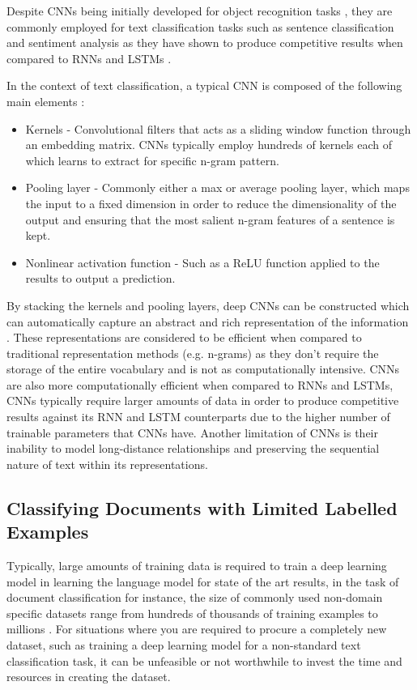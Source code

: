 \documentclass[a4paper,twoside,phd]{BYUPhys}
\begin{document}
Despite CNNs being initially developed for object recognition tasks \cite{LeCun1999}, they are commonly employed for text classification tasks such as sentence classification and sentiment analysis as they have shown to produce competitive results when compared to RNNs and LSTMs \cite{Collobert2011} \cite{Kim} \cite{Nogueira}. \newline

In the context of text classification, a typical CNN is composed of the following main elements \cite{Young}:

\begin{itemize}
	\item Kernels - Convolutional filters that acts as a sliding window function through an embedding matrix. CNNs typically employ hundreds of kernels each of which learns to extract for specific n-gram pattern.
	\item Pooling layer - Commonly either a max or average pooling layer, which maps the input to a fixed dimension in order to reduce the dimensionality of the output and ensuring that the most salient n-gram features of a sentence is kept.
	\item Nonlinear activation function - Such as a ReLU function applied to the results to output a prediction.
\end{itemize}

By stacking the kernels and pooling layers, deep CNNs can be constructed which can automatically capture an abstract and rich representation of the information \cite{Young}. These representations are considered to be efficient when compared to traditional representation methods (e.g. n-grams) as they don't require the storage of the entire vocabulary and is not as computationally intensive. CNNs are also more computationally efficient when compared to RNNs and LSTMs, CNNs typically require larger amounts of data in order to produce competitive results against its RNN and LSTM counterparts due to the higher number of trainable parameters that CNNs have. Another limitation of CNNs is their inability to model long-distance relationships and preserving the sequential nature of text within its representations.

\subsection{Classifying Documents with Limited Labelled Examples}
\label{sec:TransferLearning}
Typically, large amounts of training data is required to train a deep learning model in learning the language model for state of the art results, in the task of document classification for instance, the size of commonly used non-domain specific datasets range from hundreds of thousands of training examples to millions \cite{Conneau2017} \cite{Zhang}. For situations where you are required to procure a completely new dataset, such as training a deep learning model for a non-standard text classification task, it can be unfeasible  or not worthwhile to invest the time and resources in creating the dataset. 
\end{document}
